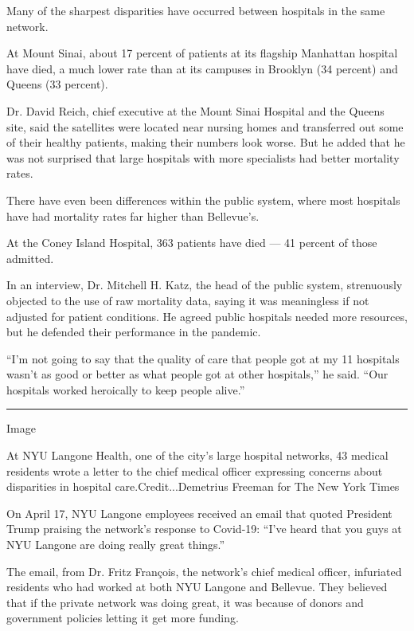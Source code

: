 Many of the sharpest disparities have occurred between hospitals in the
same network.

At Mount Sinai, about 17 percent of patients at its flagship Manhattan
hospital have died, a much lower rate than at its campuses in Brooklyn
(34 percent) and Queens (33 percent).

Dr. David Reich, chief executive at the Mount Sinai Hospital and the
Queens site, said the satellites were located near nursing homes and
transferred out some of their healthy patients, making their numbers
look worse. But he added that he was not surprised that large hospitals
with more specialists had better mortality rates.

There have even been differences within the public system, where most
hospitals have had mortality rates far higher than Bellevue's.

At the Coney Island Hospital, 363 patients have died --- 41 percent of
those admitted.

In an interview, Dr. Mitchell H. Katz, the head of the public system,
strenuously objected to the use of raw mortality data, saying it was
meaningless if not adjusted for patient conditions. He agreed public
hospitals needed more resources, but he defended their performance in
the pandemic.

``I'm not going to say that the quality of care that people got at my 11
hospitals wasn't as good or better as what people got at other
hospitals,'' he said. ``Our hospitals worked heroically to keep people
alive.''

\begin{center}\rule{0.5\linewidth}{\linethickness}\end{center}

Image

At NYU Langone Health, one of the city's large hospital networks, 43
medical residents wrote a letter to the chief medical officer expressing
concerns about disparities in hospital care.Credit...Demetrius Freeman
for The New York Times

On April 17, NYU Langone employees received an email that quoted
President Trump praising the network's response to Covid-19: ``I've
heard that you guys at NYU Langone are doing really great things.''

The email, from Dr. Fritz François, the network's chief medical officer,
infuriated residents who had worked at both NYU Langone and Bellevue.
They believed that if the private network was doing great, it was
because of donors and government policies letting it get more funding.


